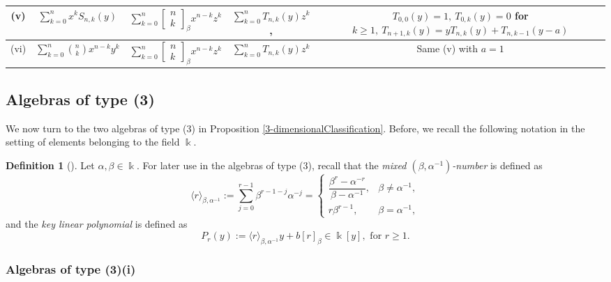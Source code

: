 \documentclass{amsart}
\theoremstyle{definition}
\newtheorem{definition}[theorem]{Definition}
\theoremstyle{remark}
\numberwithin{equation}{section}
\begin{document}
\begin{table}[H]
{\begin{tabular}{ |c|c|c|c|c| }
\hline
(v) & $\displaystyle\sum_{k=0}^{n}x^{k}S_{n,k}(y)$ & $\displaystyle\sum_{k=0}^{n}\begin{bmatrix} n\\ k\end{bmatrix}_{\beta}x^{n-k}z^{k}$ & $\sum_{k=0}^{n}T_{n,k}(y)z^{k}$, & $T_{0,0}(y)=1,\ T_{0,k}(y)=0$ for $k\ge 1,\
T_{n+1,k}(y)=yT_{n,k}(y)+T_{n,k-1}(y-a)$\\
\hline
(vi) & $\displaystyle\sum_{k=0}^{n}\binom{n}{k}x^{n-k}y^k$ & $\displaystyle\sum_{k=0}^{n}\begin{bmatrix} n\\ k\end{bmatrix}_{\beta}x^{n-k}z^{k}$ & $\displaystyle\sum_{k=0}^{n}T_{n,k}(y)z^{k}$ & Same (v) with $a=1$ \\ 
\hline
\end{tabular}
}
\end{table}


\subsection{Algebras of type (3)}

We now turn to the two algebras of type (3) in Proposition \ref{3-dimensionalClassification}. Before, we recall the following notation in the setting of elements belonging to the field $\Bbbk$.

\begin{definition}[{\cite[Definition 1]{Sadjang2013}}]\label{mixedNumber}
Let $\alpha, \beta\in \Bbbk$. For later use in the algebras of type (3), recall that the \textit{mixed $(\beta,\alpha^{-1})$-number} is defined as
\begin{equation}
\langle r\rangle_{\beta,\alpha^{-1}}
:=\sum_{j=0}^{r-1}\beta^{r-1-j}\alpha^{-j}=
\begin{cases}
\dfrac{\beta^{r}-\alpha^{-r}}{\beta-\alpha^{-1}},& \beta\neq \alpha^{-1},\\
r\beta^{r-1},& \beta=\alpha^{-1},
\end{cases}
\end{equation}
and the \textit{key linear polynomial} is defined as
\begin{equation}
P_r(y):=\langle r\rangle_{\beta,\alpha^{-1}}y+b[r]_\beta\in\Bbbk[y], \text{ for } r\ge 1.
\end{equation}
\end{definition}


\subsubsection{Algebras of type (3)(i)}
\end{document}
